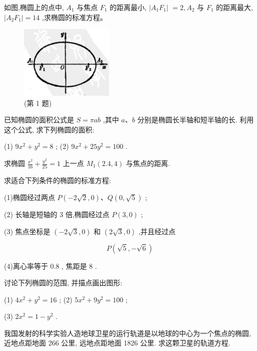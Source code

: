 \documentclass[lang=cn,newtx,10pt,scheme=chinese]{elegantbook}
\begin{document}
\begin{problemset}[习 题 六]

\item 如图,椭圆上的点中, \({A}_{1}\) 与焦点 \({F}_{1}\) 的距离最小, \(\left| {{A}_{1}{F}_{1}}\right|\) \(= 2,{A}_{2}\) 与 \({F}_{1}\) 的距离最大, \(\left| {{A}_{2}{F}_{1}}\right| = {14}\) ,求椭圆的标准方程。

\begin{figure}[h]
	\centering
	\includegraphics[max width=0.4\textwidth]{images/01912cc2-ffb6-728e-9ae7-b113ff05c64b_94_706053.jpg}
	\caption{(第 1 题)}
\end{figure}
\item 已知椭圆的面积公式是 \(S = {\pi ab}\) ,其中 \(a\text{、}b\) 分别是椭圆长半轴和短半轴的长. 利用这个公式, 求下列椭圆的面积:

(1) \(9{x}^{2} + {y}^{2} = 8\) ; (2) \(9{x}^{2} + {25}{y}^{2} = {100}\) .

\item 求椭圆 \(\frac{{x}^{2}}{16} + \frac{{y}^{2}}{25} = 1\) 上一点 \({M}_{1}\left( {{2.4},4}\right)\) 与焦点的距离.

\item 求适合下列条件的椭圆的标准方程:

(1)椭圆经过两点 \(P\left( {-2\sqrt{2},0}\right) \text{、}Q\left( {0,\sqrt{5}}\right)\) ;

(2) 长轴是短轴的 3 倍,椭圆经过点 \(P\left( {3,0}\right)\) ;

(3) 焦点坐标是 \(\left( {-2\sqrt{3},0}\right)\) 和 \(\left( {2\sqrt{3},0}\right)\) ,并且经过点

\[
  P\left( {\sqrt{5}, - \sqrt{6}}\right)
\]

(4)离心率等于 0.8 , 焦距是 8 .

\item 讨论下列椭圆的范围, 并描点画出图形:

(1) \(4{x}^{2} + {y}^{2} = {16}\) ; (2) \(5{x}^{2} + 9{y}^{2} = {100}\) ;

(3) \(2{x}^{2} = 1 - {y}^{2}\) .

\item 我国发射的科学实验人造地球卫星的运行轨道是以地球的中心为一个焦点的椭圆, 近地点距地面 266 公里, 远地点距地面 1826 公里. 求这颗卫星的轨道方程.


\end{problemset}
\end{document}
